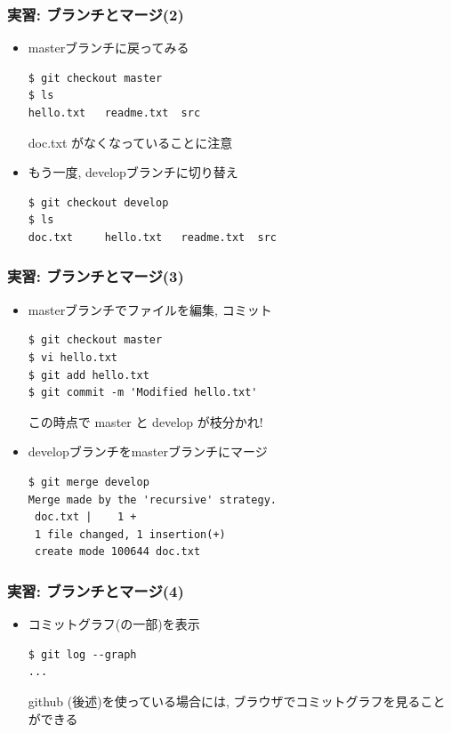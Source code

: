 \begin{frame}[t,fragile]
  \frametitle{実習: ブランチとマージ(2)}
  \begin{itemize}
  \item masterブランチに戻ってみる
\begin{lstlisting}
$ git checkout master
$ ls
hello.txt	readme.txt	src
\end{lstlisting}
doc.txt がなくなっていることに注意 \\[.5em]
  \item もう一度, developブランチに切り替え
\begin{lstlisting}
$ git checkout develop
$ ls
doc.txt		hello.txt	readme.txt	src
\end{lstlisting}
  \end{itemize}
\end{frame}

\begin{frame}[t,fragile]
  \frametitle{実習: ブランチとマージ(3)}
  \begin{itemize}
  \item masterブランチでファイルを編集, コミット
\begin{lstlisting}
$ git checkout master
$ vi hello.txt
$ git add hello.txt
$ git commit -m 'Modified hello.txt'
\end{lstlisting}
この時点で master と develop が枝分かれ! \\[.5em]
  \item developブランチをmasterブランチにマージ
\begin{lstlisting}
$ git merge develop
Merge made by the 'recursive' strategy.
 doc.txt |    1 +
 1 file changed, 1 insertion(+)
 create mode 100644 doc.txt
\end{lstlisting}
  \end{itemize}
\end{frame}

\begin{frame}[t,fragile]
  \frametitle{実習: ブランチとマージ(4)}
  \begin{itemize}
  \item コミットグラフ(の一部)を表示
\begin{lstlisting}
$ git log --graph
...
\end{lstlisting}
github (後述)を使っている場合には, ブラウザでコミットグラフを見ることができる
  \end{itemize}
\end{frame}

